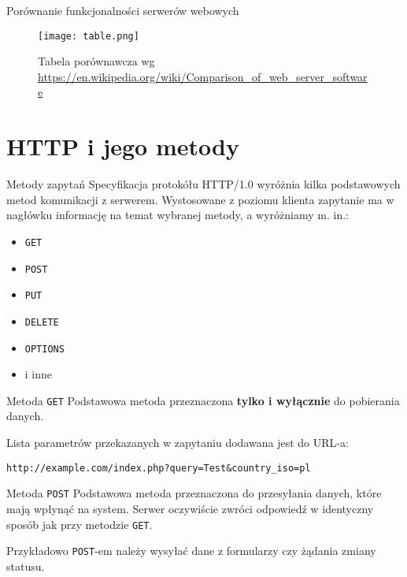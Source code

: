 \begin{frame}{Porównanie funkcjonalności serwerów webowych}
	\begin{figure}[t]
		\centering
		\texttt{[image: table.png]}
		\caption{Tabela porównawcza wg \url{https://en.wikipedia.org/wiki/Comparison_of_web_server_software}}
	\end{figure}
\end{frame}

\section{HTTP i jego metody}

\begin{frame}{Metody zapytań}
	Specyfikacja protokółu HTTP/1.0 wyróżnia kilka podstawowych metod komunikacji z serwerem. Wystosowane z poziomu klienta zapytanie ma w nagłówku informację na temat wybranej metody, a wyróżniamy m. in.:
	
	\begin{itemize}
		\item \texttt{GET}
		\item \texttt{POST}
		\item \texttt{PUT}
		\item \texttt{DELETE}
		\item \texttt{OPTIONS}
		\item i inne
	\end{itemize}
\end{frame}

\begin{frame}[fragile]{Metoda \texttt{GET}}
	Podstawowa metoda przeznaczona \textbf{tylko i wyłącznie} do pobierania danych.
	
	Lista parametrów przekazanych w zapytaniu dodawana jest do URL-a:
	\begin{lstlisting}
http://example.com/index.php?query=Test&country_iso=pl
	\end{lstlisting}
\end{frame}

\begin{frame}[fragile]{Metoda \texttt{POST}}
	Podstawowa metoda przeznaczona do przesyłania danych, które mają wpłynąć na system. Serwer oczywiście zwróci odpowiedź w identyczny sposób jak przy metodzie \texttt{GET}.
	
	Przykładowo \texttt{POST}-em należy wysyłać dane z formularzy czy żądania zmiany statusu. 
\end{frame}

